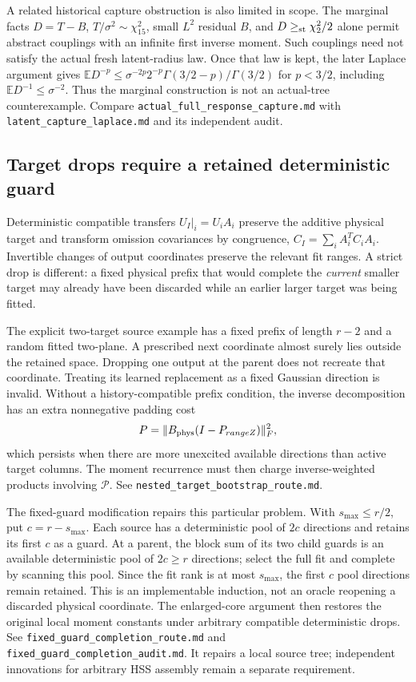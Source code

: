 \documentclass[11pt,oneside,openany,a4paper]{report}
\numberwithin{equation}{chapter}
\theoremstyle{definition}
\theoremstyle{remark}
\newcommand{\sourcefile}[1]{{\small\nolinkurl{#1}}}
\begin{document}
A related historical capture obstruction is also limited in scope.
The marginal facts $D=T-B$, $T/\sigma^2\sim\chi^2_{15}$, small
$L^2$ residual $B$, and $D\ge_{\rm st}\chi^2_2/2$ alone permit abstract
couplings with an infinite first inverse moment.  Such couplings need
not satisfy the actual fresh latent-radius law.  Once that law is kept,
the later Laplace argument gives
$\mathbb ED^{-p}\le\sigma^{-2p}2^{-p}
\Gamma(3/2-p)/\Gamma(3/2)$ for $p<3/2$, including
$\mathbb ED^{-1}\le\sigma^{-2}$.  Thus the marginal construction is
not an actual-tree counterexample.  Compare
\sourcefile{actual_full_response_capture.md} with
\sourcefile{latent_capture_laplace.md} and its independent audit.

\subsection{Target drops require a retained deterministic guard}

Deterministic compatible transfers
$U_I|_i=U_iA_i$ preserve the additive physical target and transform
omission covariances by congruence,
$C_I=\sum_iA_i^TC_iA_i$.  Invertible changes of output coordinates
preserve the relevant fit ranges.  A strict drop is different: a fixed
physical prefix that would complete the \emph{current} smaller target
may already have been discarded while an earlier larger target was
being fitted.

The explicit two-target source example has a fixed prefix of length
$r-2$ and a random fitted two-plane.  A prescribed next coordinate
almost surely lies outside the retained space.  Dropping one output
at the parent does not recreate that coordinate.  Treating its learned
replacement as a fixed Gaussian direction is invalid.  Without a
history-compatible prefix condition, the inverse decomposition has an
extra nonnegative padding cost
\[
 \mathcal P=\|B_{\rm phys}(I-P_{\operatorname{range}Z})\|_F^2,
\]
which persists when there are more unexcited available directions than
active target columns.  The moment recurrence must then charge
inverse-weighted products involving $\mathcal P$.
See \sourcefile{nested_target_bootstrap_route.md}.

The fixed-guard modification repairs this particular problem.  With
$s_{\max}\le r/2$, put $c=r-s_{\max}$.  Each source has a deterministic
pool of $2c$ directions and retains its first $c$ as a guard.  At a
parent, the block sum of its two child guards is an available
deterministic pool of $2c\ge r$ directions; select the full fit and
complete by scanning this pool.  Since the fit rank is at most
$s_{\max}$, the first $c$ pool directions remain retained.  This is an
implementable induction, not an oracle reopening a discarded physical
coordinate.  The enlarged-core argument then restores the original
local moment constants under arbitrary compatible deterministic drops.
See \sourcefile{fixed_guard_completion_route.md} and
\sourcefile{fixed_guard_completion_audit.md}.  It repairs a local source
tree; independent innovations for arbitrary HSS assembly remain a
separate requirement.
\end{document}
